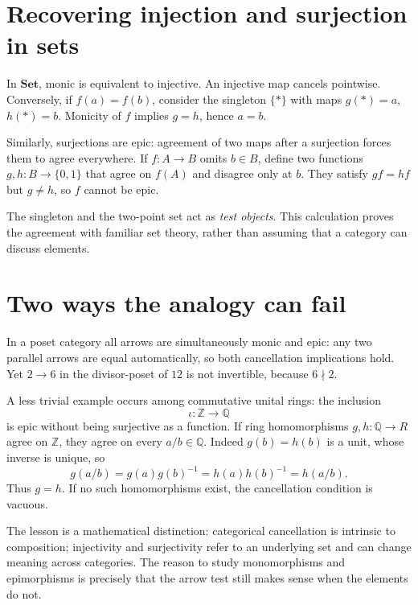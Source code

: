 \section{Recovering injection and surjection in sets}

In \(\mathbf{Set}\), monic is equivalent to injective. An injective map cancels pointwise. Conversely, if \(f(a)=f(b)\), consider the singleton \(\{*\}\) with maps \(g(*)=a\), \(h(*)=b\). Monicity of \(f\) implies \(g=h\), hence \(a=b\).

Similarly, surjections are epic: agreement of two maps after a surjection forces them to agree everywhere. If \(f:A\to B\) omits \(b\in B\), define two functions \(g,h:B\to\{0,1\}\) that agree on \(f(A)\) and disagree only at \(b\). They satisfy \(gf=hf\) but \(g\ne h\), so \(f\) cannot be epic.

The singleton and the two-point set act as \emph{test objects}. This calculation proves the agreement with familiar set theory, rather than assuming that a category can discuss elements.

\section{Two ways the analogy can fail}

In a poset category all arrows are simultaneously monic and epic: any two parallel arrows are equal automatically, so both cancellation implications hold. Yet \(2\to6\) in the divisor-poset of \(12\) is not invertible, because \(6\nmid 2\).

A less trivial example occurs among commutative unital rings: the inclusion
\[
 \iota:\mathbb Z\longrightarrow\mathbb Q
\]
is epic without being surjective as a function. If ring homomorphisms \(g,h:\mathbb Q\to R\) agree on \(\mathbb Z\), they agree on every \(a/b\in\mathbb Q\). Indeed \(g(b)=h(b)\) is a unit, whose inverse is unique, so
\[
 g(a/b)=g(a)g(b)^{-1}=h(a)h(b)^{-1}=h(a/b).
\]
Thus \(g=h\). If no such homomorphisms exist, the cancellation condition is vacuous.

The lesson is a mathematical distinction: categorical cancellation is intrinsic to composition; injectivity and surjectivity refer to an underlying set and can change meaning across categories. The reason to study monomorphisms and epimorphisms is precisely that the arrow test still makes sense when the elements do not.

